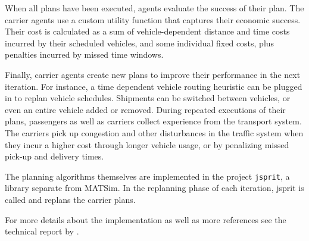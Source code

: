When all plans have been executed, agents evaluate the success of their plan. The carrier agents use a custom 
utility function that captures their economic success. Their cost is calculated as a sum of vehicle-dependent 
distance and time costs incurred by their scheduled vehicles, and some individual fixed costs, plus penalties 
incurred by missed time windows.

Finally, carrier agents create new plans to improve their performance in the next iteration. For instance, a time dependent vehicle routing heuristic can be plugged in to replan vehicle schedules. Shipments can be switched between vehicles, or even an entire vehicle added or removed.
During repeated executions of their plans, passengers as well as carriers collect experience from the transport system. The carriers pick up congestion and other disturbances in the traffic system when they incur a higher cost through longer vehicle usage, or by penalizing missed pick-up and delivery times.

The planning algorithms themselves are implemented in the project \lstinline|jsprit|, a library separate from MATSim.
In the replanning phase of each iteration, jsprit is called and replans the carrier plans.

For more details about the implementation as well as more references see the technical report by \citet[][]{ZilskeEtAl_TechRep_VSP_2012}.


